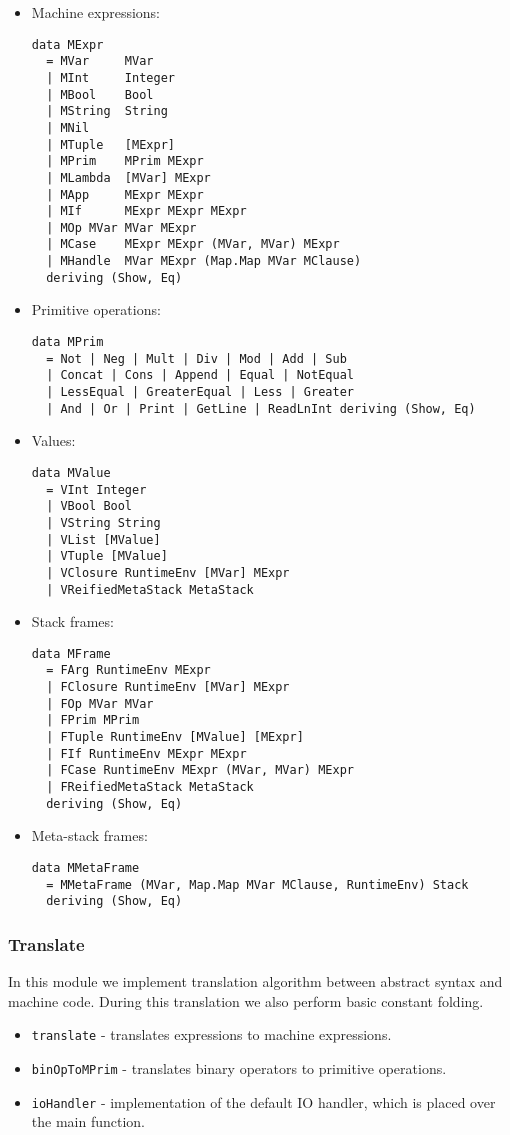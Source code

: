 \documentclass[a4paper]{article}
\begin{document}
\begin{itemize}
\item Machine expressions:
\begin{verbatim}
data MExpr
  = MVar     MVar
  | MInt     Integer
  | MBool    Bool
  | MString  String
  | MNil
  | MTuple   [MExpr]
  | MPrim    MPrim MExpr
  | MLambda  [MVar] MExpr
  | MApp     MExpr MExpr
  | MIf      MExpr MExpr MExpr
  | MOp MVar MVar MExpr
  | MCase    MExpr MExpr (MVar, MVar) MExpr
  | MHandle  MVar MExpr (Map.Map MVar MClause)
  deriving (Show, Eq)
\end{verbatim}
\item Primitive operations:
\begin{verbatim}
data MPrim
  = Not | Neg | Mult | Div | Mod | Add | Sub
  | Concat | Cons | Append | Equal | NotEqual
  | LessEqual | GreaterEqual | Less | Greater
  | And | Or | Print | GetLine | ReadLnInt deriving (Show, Eq)
\end{verbatim}
\item Values:
\begin{verbatim}
data MValue
  = VInt Integer
  | VBool Bool
  | VString String
  | VList [MValue]
  | VTuple [MValue]
  | VClosure RuntimeEnv [MVar] MExpr
  | VReifiedMetaStack MetaStack
\end{verbatim}
\item Stack frames:
\begin{verbatim}
data MFrame
  = FArg RuntimeEnv MExpr
  | FClosure RuntimeEnv [MVar] MExpr
  | FOp MVar MVar
  | FPrim MPrim
  | FTuple RuntimeEnv [MValue] [MExpr]
  | FIf RuntimeEnv MExpr MExpr
  | FCase RuntimeEnv MExpr (MVar, MVar) MExpr
  | FReifiedMetaStack MetaStack
  deriving (Show, Eq)
\end{verbatim}
\item Meta-stack frames:
\begin{verbatim}
data MMetaFrame
  = MMetaFrame (MVar, Map.Map MVar MClause, RuntimeEnv) Stack
  deriving (Show, Eq)
\end{verbatim}
\end{itemize}

\subsubsection*{Translate}
In this module we implement translation algorithm between abstract syntax and machine code.
During this translation we also perform basic constant folding.

\begin{itemize}
  \item \verb+translate+ - translates expressions to machine expressions.
  \item \verb+binOpToMPrim+ - translates binary operators to primitive operations.
  \item \verb+ioHandler+ - implementation of the default IO handler,
              which is placed over the main function.
\end{itemize}
\end{document}
